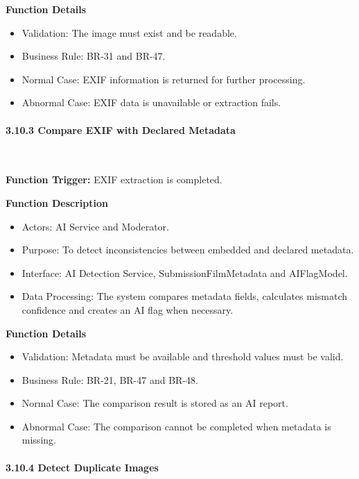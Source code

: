 \textbf{Function Details}
\begin{itemize}[leftmargin=1.5em, nosep]
    \item Validation: The image must exist and be readable.
    \item Business Rule: BR-31 and BR-47.
    \item Normal Case: EXIF information is returned for further processing.
    \item Abnormal Case: EXIF data is unavailable or extraction fails.
\end{itemize}

\paragraph*{3.10.3 Compare EXIF with Declared Metadata}\leavevmode\\[-0.5em]
\label{par:compare-exif-declared-metadata}

\textbf{Function Trigger:} EXIF extraction is completed.

\textbf{Function Description}
\begin{itemize}[leftmargin=1.5em, nosep]
    \item Actors: AI Service and Moderator.
    \item Purpose: To detect inconsistencies between embedded and declared metadata.
    \item Interface: AI Detection Service, SubmissionFilmMetadata and AIFlagModel.
    \item Data Processing: The system compares metadata fields, calculates mismatch confidence and creates an AI flag when necessary.
\end{itemize}

\textbf{Function Details}
\begin{itemize}[leftmargin=1.5em, nosep]
    \item Validation: Metadata must be available and threshold values must be valid.
    \item Business Rule: BR-21, BR-47 and BR-48.
    \item Normal Case: The comparison result is stored as an AI report.
    \item Abnormal Case: The comparison cannot be completed when metadata is missing.
\end{itemize}

\paragraph*{3.10.4 Detect Duplicate Images}\leavevmode\\[-0.5em]
\label{par:detect-duplicate-images}

